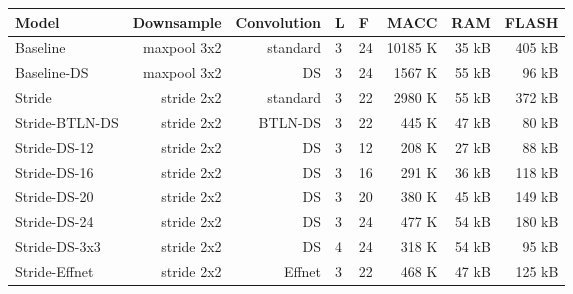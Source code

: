 \begin{tabular}{lrrllrrr}
\toprule
          Model &   Downsample & Convolution &  L &   F &     MACC &    RAM &   FLASH \\
\midrule
       Baseline &  maxpool 3x2 &    standard &  3 &  24 &  10185 K &  35 kB &  405 kB \\
    Baseline-DS &  maxpool 3x2 &          DS &  3 &  24 &   1567 K &  55 kB &   96 kB \\
         Stride &   stride 2x2 &    standard &  3 &  22 &   2980 K &  55 kB &  372 kB \\
 Stride-BTLN-DS &   stride 2x2 &     BTLN-DS &  3 &  22 &    445 K &  47 kB &   80 kB \\
   Stride-DS-12 &   stride 2x2 &          DS &  3 &  12 &    208 K &  27 kB &   88 kB \\
   Stride-DS-16 &   stride 2x2 &          DS &  3 &  16 &    291 K &  36 kB &  118 kB \\
   Stride-DS-20 &   stride 2x2 &          DS &  3 &  20 &    380 K &  45 kB &  149 kB \\
   Stride-DS-24 &   stride 2x2 &          DS &  3 &  24 &    477 K &  54 kB &  180 kB \\
  Stride-DS-3x3 &   stride 2x2 &          DS &  4 &  24 &    318 K &  54 kB &   95 kB \\
  Stride-Effnet &   stride 2x2 &      Effnet &  3 &  22 &    468 K &  47 kB &  125 kB \\
\bottomrule
\end{tabular}
